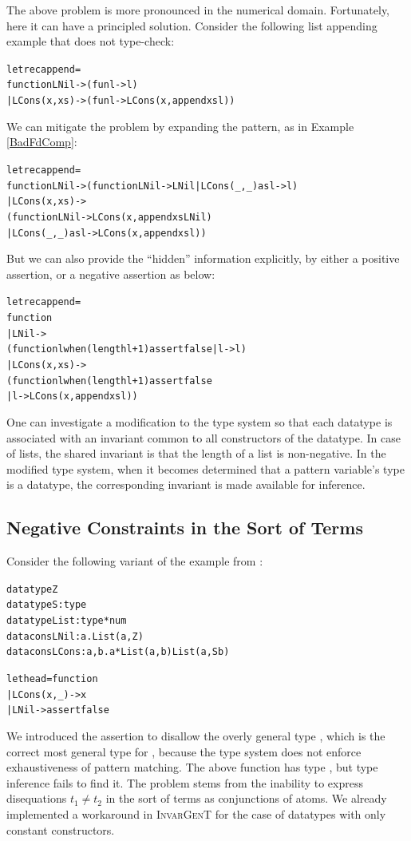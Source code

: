 \documentclass{article}
\newcommand{\tmname}[1]{\textsc{#1}}
\newcommand{\tmverbatim}[1]{{\ttfamily{#1}}}
\newenvironment{tmcode}[1][]{\begin{alltt}}{\end{alltt}}
\begin{document}
The above problem is more pronounced in the numerical domain. Fortunately,
here it can have a principled solution. Consider the following list appending
example that does not type-check:
\begin{tmcode}
let rec append =
  function LNil -> (fun l -> l)
    | LCons (x, xs) -> (fun l -> LCons (x, append xs l))
\end{tmcode}
We can mitigate the problem by expanding the pattern, as in Example
\ref{BadFdComp}:
\begin{tmcode}
let rec append =
  function LNil -> (function LNil -> LNil | LCons (_,_) as l -> l)
    | LCons (x, xs) ->
      (function LNil -> LCons (x, append xs LNil)
        | LCons (_,_) as l -> LCons (x, append xs l))
\end{tmcode}
But we can also provide the ``hidden'' information explicitly, by either a
positive assertion, or a negative assertion as below:
\begin{tmcode}
let rec append =
  function
    | LNil ->
      (function l when (length l + 1)  assert false | l -> l)
    | LCons (x, xs) ->
      (function l when (length l + 1)  assert false
      | l -> LCons (x, append xs l))
\end{tmcode}
One can investigate a modification to the type system so that each datatype is
associated with an invariant common to all constructors of the datatype. In
case of lists, the shared invariant is that the length of a list is
non-negative. In the modified type system, when it becomes determined that a
pattern variable's type is a datatype, the corresponding invariant is made
available for inference.

\subsection{Negative Constraints in the Sort of Terms}

\begin{example}
  Consider the following variant of the \tmverbatim{head} example from
  {\cite{PracticalGADTsInfer}}:
  \begin{tmcode}
  datatype Z
datatype S : type
datatype List : type * num
datacons LNil : a. List(a, Z)
datacons LCons : a, b. a * List(a, b)  List(a, S b)

let head = function
  | LCons (x, _) -> x
  | LNil -> assert false
  \end{tmcode}
  We introduced the assertion to disallow the overly general type
  \tmverbatim{$\forall$a, b. List (a, b) $\rightarrow$ a}, which is the
  correct most general type for \tmverbatim{function LCons (x, \_) -> x},
  because the type system does not enforce exhaustiveness of pattern matching.
  The above function has type \tmverbatim{$\forall$a, b. List (a, S b)
  $\rightarrow$ a}, but type inference fails to find it. The problem stems
  from the inability to express disequations $t_1 \neq t_2$ in the sort of
  terms as conjunctions of atoms. We already implemented a workaround in
  {\tmname{InvarGenT}} for the case of datatypes with only constant
  constructors.
\end{example}
\end{document}
